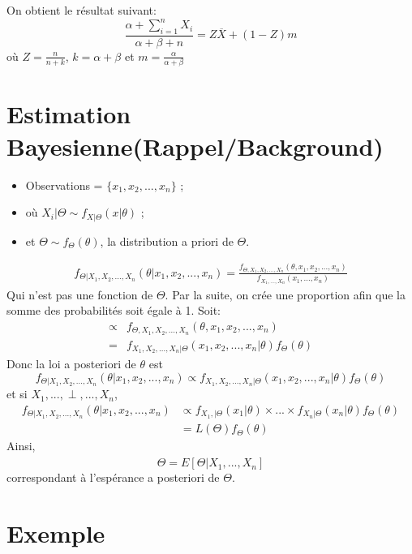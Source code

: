 \documentclass[11pt,french]{report}
\begin{document}
On obtient le résultat suivant:
\begin{equation}
\frac{\alpha + \sum_{i =1}^{n} X_i}{\alpha + \beta + n} = Z \overline{X} + (1 - Z) m
\end{equation}
où $Z = \frac{n}{n + k}$, $k = \alpha + \beta$ et $m= \frac{\alpha}{\alpha + \beta}$

\section{Estimation Bayesienne(Rappel/Background)}
\label{sec:theo:bayes}
\begin{itemize}
\item Observations = $\lbrace x_1, x_2, ..., x_n \rbrace$ ;
\item où $X_i|\Theta \sim f_{X|\Theta}(x|\theta)$ ;
\item et $\Theta \sim f_{\Theta}(\theta)$, la distribution a priori de $\Theta$.
\end{itemize}
\begin{align*}
 f_{\Theta|X_1, X_2, ..., X_n}(\theta|x_1, x_2, ..., x_n) = \frac{f_{\Theta,X_1, X_2, ..., X_n}(\theta,x_1, x_2, ..., x_n)}{f_{X_1,...,X_n}(x_1,...,x_n)}
\end{align*}
Qui n'est pas une fonction de $\Theta$. Par la suite, on crée une proportion afin que la somme des probabilités soit égale à 1.
 Soit:
\begin{align*}
\propto & f_{\Theta,X_1, X_2, ..., X_n}(\theta,x_1, x_2, ..., x_n)\\
=& f_{X_1, X_2, ..., X_n|\Theta}(x_1, x_2, ..., x_n|\theta) f_{\Theta}(\theta)
\end{align*}
Donc la loi a posteriori de $\theta$ est
\begin{equation}
f_{\Theta|X_1, X_2, ..., X_n}(\theta|x_1, x_2, ..., x_n) \propto f_{X_1, X_2, ..., X_n|\Theta}(x_1, x_2, ..., x_n|\theta) f_{\Theta}(\theta)
\end{equation}
et si $X_1,..., \perp,..., X_n$,
\begin{align*}
f_{\Theta|X_1, X_2, ..., X_n}(\theta|x_1, x_2, ..., x_n) &\propto  f_{X_1,|\Theta}(x_1|\theta)\times ...\times f_{X_n|\Theta}(x_n|\theta) f_{\Theta}(\theta)\\
&= L(\Theta)f_{\Theta}(\theta)
\end{align*}
Ainsi, 
\begin{equation}
\widehat{\Theta} = E[\Theta|X_1,...,X_n]
\end{equation}
correspondant à l'espérance a posteriori de $\Theta$.
\section*{Exemple}
\end{document}
